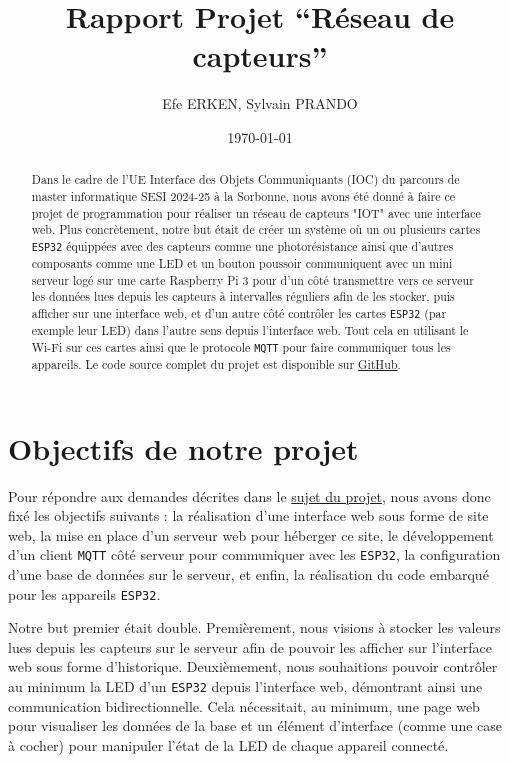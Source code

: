 \documentclass[12pt]{article}
\author{Efe ERKEN, Sylvain PRANDO}
\date{\today}
\title{Rapport Projet ``Réseau de capteurs''}
\begin{document}
\maketitle

\begin{abstract}
    Dans le cadre de l'UE Interface des Objets Communiquants (IOC) du parcours de master informatique SESI 2024-25 à la
    Sorbonne, nous avons été donné à faire ce projet de programmation pour réaliser un réseau de capteurs "IOT" avec une
    interface web.
    Plus concrètement, notre but était de créer un système où un ou plusieurs cartes \texttt{ESP32} équippées avec des
    capteurs comme une photorésistance ainsi que d'autres composants comme une LED et un bouton poussoir communiquent avec
    un mini serveur logé sur une carte Raspberry Pi 3 pour d'un côté transmettre vers ce serveur les données lues depuis les
    capteurs à intervalles réguliers afin de les stocker, puis afficher sur une interface web, et d'un autre côté contrôler les cartes \texttt{ESP32} (par
    exemple leur LED) dans l'autre sens depuis l'interface web. Tout cela en utilisant le Wi-Fi sur ces cartes ainsi que le
    protocole \texttt{MQTT} pour faire communiquer tous les appareils.
    Le code source complet du projet est disponible sur \href{https://github.com/GreengagePlum/Project-IOT}{GitHub}.
\end{abstract}

\section{Objectifs de notre projet}
Pour répondre aux demandes décrites dans le \href{https://github.com/GreengagePlum/Project-IOT/blob/v1.0.0/IOC_mode_projet%20%E2%80%93%20SESI.pdf}{sujet du projet}, nous avons donc fixé les objectifs suivants : la réalisation d'une interface web sous forme de site web, la mise en place d'un serveur web pour héberger ce site, le développement d'un client \texttt{MQTT} côté serveur pour communiquer avec les \texttt{ESP32}, la configuration d'une base de données sur le serveur, et enfin, la réalisation du code embarqué pour les appareils \texttt{ESP32}.

Notre but premier était double. Premièrement, nous visions à stocker les valeurs lues depuis les capteurs sur le serveur afin de pouvoir les afficher sur l'interface web sous forme d'historique. Deuxièmement, nous souhaitions pouvoir contrôler au minimum la LED d'un \texttt{ESP32} depuis l'interface web, démontrant ainsi une communication bidirectionnelle. Cela nécessitait, au minimum, une page web pour visualiser les données de la base et un élément d'interface (comme une case à cocher) pour manipuler l'état de la LED de chaque appareil connecté.
\end{document}
